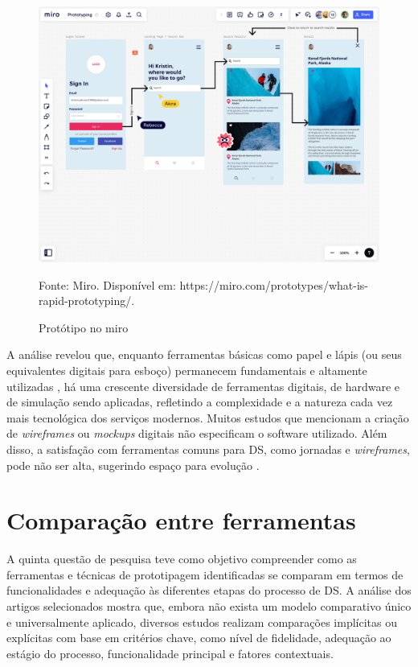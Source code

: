 \begin{itemize}
	\begin{figure}[H]
		\centering
		\includegraphics[width=0.8\linewidth]{figuras/prototipo-miro}
		\caption{Protótipo no miro}
		Fonte: Miro. Disponível em: https://miro.com/prototypes/what-is-rapid-prototyping/. 
		\label{fig:ferramentas-prototipacao}
	\end{figure}
	
\end{itemize}

A análise revelou que, enquanto ferramentas básicas como papel e lápis (ou seus equivalentes digitais para esboço) permanecem fundamentais e altamente utilizadas \cite{wang2023smartproducts}, há uma crescente diversidade de ferramentas digitais, de hardware e de simulação sendo aplicadas, refletindo a complexidade e a natureza cada vez mais tecnológica dos serviços modernos. Muitos estudos que mencionam a criação de \textit{wireframes} ou \textit{mockups} digitais não especificam o software utilizado. Além disso, a satisfação com ferramentas comuns para DS, como jornadas e \textit{wireframes}, pode não ser alta, sugerindo espaço para evolução \cite{wang2023smartproducts}.



\section{Comparação entre ferramentas}

A quinta questão de pesquisa teve como objetivo compreender como as ferramentas e técnicas de prototipagem identificadas se comparam em termos de funcionalidades e adequação às diferentes etapas do processo de DS. A análise dos artigos selecionados mostra que, embora não exista um modelo comparativo único e universalmente aplicado, diversos estudos realizam comparações implícitas ou explícitas com base em critérios chave, como nível de fidelidade, adequação ao estágio do processo, funcionalidade principal e fatores contextuais.

